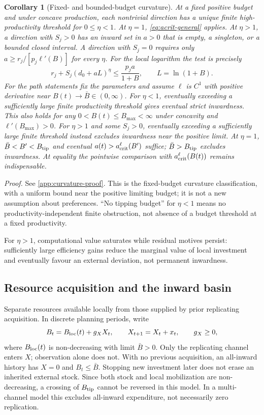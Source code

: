 \documentclass[11pt,a4paper]{article}
\newtheorem{corollary}[proposition]{Corollary}
\theoremstyle{definition}\newtheorem{definition}{Definition}
\begin{document}
\begin{corollary}[Fixed- and bounded-budget curvature]
\label{prop:curvature}
At a fixed positive budget and under concave production, each nontrivial
direction has a unique finite high-productivity threshold for
$0\leq\eta<1$. At $\eta=1$, \cref{eq:acrit-general} applies.
At $\eta>1$, a direction with $S_j>0$ has an inward set in $a>0$
that is empty, a singleton, or a bounded closed interval. A direction
with $S_j=0$ requires only $a\geq r_j/[p_j\ell'(B)]$ for every $\eta$.
For the local logarithm the test is precisely
\begin{equation}
 r_j+S_j(d_0+aL)^\eta\leq\frac{p_ja}{1+B},
 \qquad L=\ln(1+B).
 \label{eq:iso-corner}
\end{equation}
For the path statements fix the parameters and assume $\ell$ is $C^1$
with positive derivative near $B(t)\to\bar B\in(0,\infty)$.
For $\eta<1$, eventually exceeding a sufficiently large finite productivity
threshold gives eventual strict inwardness. This also holds for any
$0<B(t)\leq B_{\max}<\infty$ under concavity and
$\ell'(B_{\max})>0$. For $\eta>1$ and some $S_j>0$, eventually
exceeding a sufficiently large finite threshold instead excludes inwardness
near the positive limit. At $\eta=1$, $\bar B<B'<B_{\rm tip}$ and
eventual $a(t)>a_{\rm crit}^{\ell}(B')$ suffice; $\bar B>B_{\rm tip}$
excludes inwardness. At equality the pointwise comparison with
$a_{\rm crit}^{\ell}(B(t))$ remains indispensable.
\end{corollary}
\noindent\emph{Proof.}
See \cref{app:curvature-proof}. This is the fixed-budget curvature
classification, with a uniform bound near the positive limiting budget;
it is not a new assumption about preferences. ``No tipping budget''
for $\eta<1$ means no productivity-independent finite obstruction,
not absence of a budget threshold at a fixed productivity.

For $\eta>1$, computational value saturates while residual motives persist:
sufficiently large efficiency gains reduce the marginal value of local
investment and eventually favour an external deviation, not permanent inwardness.

\subsection{Resource acquisition and the inward basin}

Separate resources available locally from those supplied by prior
replicating acquisition. In discrete planning periods, write
\begin{equation}
 B_t=B_{\rm loc}(t)+g_XX_t,\qquad
 X_{t+1}=X_t+x_t,\qquad g_X\geq0,
 \label{eq:acquisition-stock}
\end{equation}
where $B_{\rm loc}(t)$ is non-decreasing with limit $\bar B>0$.
Only the replicating channel enters $X$; observation alone does not.
With no previous acquisition, an all-inward history has $X=0$ and
$B_t\leq\bar B$. Stopping new investment later does not erase an
inherited external stock. Since both stock and local mobilization are
non-decreasing, a crossing of $B_{\rm tip}$ cannot be reversed in this
model. In a multi-channel model this excludes all-inward expenditure,
not necessarily zero replication.
\end{document}
